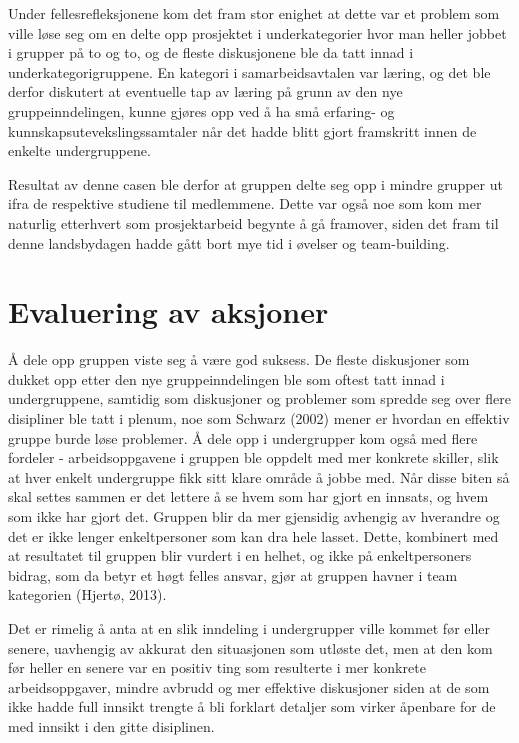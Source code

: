 Under fellesrefleksjonene kom det fram stor enighet at dette var et problem som ville løse seg om en delte opp prosjektet i underkategorier hvor man heller jobbet i grupper på to og to, og de fleste diskusjonene ble da tatt innad i underkategorigruppene. En kategori i samarbeidsavtalen var læring, og det ble derfor diskutert at eventuelle tap av læring på grunn av den nye gruppeinndelingen, kunne gjøres opp ved å ha små erfaring- og kunnskapsutevekslingssamtaler når det hadde blitt gjort framskritt innen de enkelte undergruppene.

Resultat av denne casen ble derfor at gruppen delte seg opp i mindre grupper ut ifra de respektive studiene til medlemmene. Dette var også noe som kom mer naturlig etterhvert som prosjektarbeid begynte å gå framover, siden det fram til denne landsbydagen hadde gått bort mye tid i øvelser og team-building.

\section{Evaluering av aksjoner}
Å dele opp gruppen viste seg å være god suksess. De fleste diskusjoner som dukket opp etter den nye gruppeinndelingen ble som oftest tatt innad i undergruppene, samtidig som diskusjoner og problemer som spredde seg over flere disipliner ble tatt i plenum, noe som Schwarz (2002) mener er hvordan en effektiv gruppe burde løse problemer. Å dele opp i undergrupper kom også med flere fordeler - arbeidsoppgavene i gruppen ble oppdelt med mer konkrete skiller, slik at hver enkelt undergruppe fikk sitt klare område å jobbe med. Når disse biten så skal settes sammen er det lettere å se hvem som har gjort en innsats, og hvem som ikke har gjort det. Gruppen blir da mer gjensidig avhengig av hverandre og det er ikke lenger enkeltpersoner som kan dra hele lasset. Dette, kombinert med at resultatet til gruppen blir vurdert i en helhet, og ikke på enkeltpersoners bidrag, som da betyr et høgt felles ansvar, gjør at gruppen havner i team kategorien (Hjertø, 2013).

Det er rimelig å anta at en slik inndeling i undergrupper ville kommet før eller senere, uavhengig av akkurat den situasjonen som utløste det, men at den kom før heller en senere var en positiv ting som resulterte i mer konkrete arbeidsoppgaver, mindre avbrudd og mer effektive diskusjoner siden at de som ikke hadde full innsikt trengte å bli forklart detaljer som virker åpenbare for de med innsikt i den gitte disiplinen.